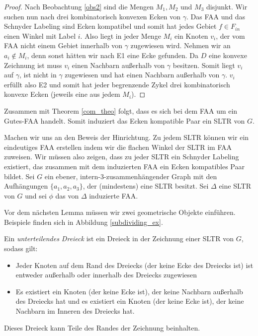 \begin{proof}
Nach Beobachtung \ref{obs2} sind die Mengen $M_1,M_2$ und $M_3$ disjunkt. Wir suchen nun nach drei kombinatorisch konvexen Ecken von $\gamma$. Das FAA und das Schnyder Labeling sind Ecken kompatibel und somit hat jedes Gebiet $f \in F_{in}$ einen Winkel mit Label $i$. Also liegt in jeder Menge $M_i$ ein Knoten $v_i$, der vom FAA nicht einem Gebiet innerhalb von $\gamma$ zugewiesen wird. Nehmen wir an $a_i \notin M_i$, denn sonst hätten wir nach E1 eine Ecke gefunden. Da $D$ eine konvexe Zeichnung ist muss $v_i$ einen Nachbarn außerhalb von $\gamma$ besitzen. Somit liegt $v_i$ auf $\gamma$, ist nicht in $\gamma$ zugewiesen und hat einen Nachbarn außerhalb von $\gamma$. $v_i$ erfüllt also E2 und somit hat jeder begrenzende Zykel drei kombinatorisch konvexe Ecken (jeweils eine aus jedem $M_i$).
\end{proof}

Zusammen mit Theorem \ref{com_theo} folgt, dass es sich bei dem FAA um ein Gutes-FAA handelt. Somit induziert das Ecken kompatible Paar ein SLTR von $G$.

Machen wir uns an den Beweis der Hinrichtung. Zu jedem SLTR können wir ein eindeutiges FAA erstellen indem wir die flachen Winkel der SLTR im FAA zuweisen. Wir müssen also zeigen, dass zu jeder SLTR ein Schnyder Labeling existiert, das zusammen mit dem induzierten FAA ein Ecken kompatibles Paar bildet. Sei $G$ ein ebener, intern-3-zusammenhängender Graph mit den Aufhängungen $\{a_1,a_2,a_3\}$, der (mindestens) eine SLTR besitzt. Sei $\Delta$ eine SLTR von $G$ und sei $\phi$ das von $\Delta$ induzierte FAA.

Vor dem nächsten Lemma müssen wir zwei geometrische Objekte einführen. Beispiele finden sich in Abbildung \ref{subdividing_ex}.

\begin{definition}
Ein \textit{unterteilendes Dreieck} ist ein Dreieck in der Zeichnung einer SLTR von $G$, sodass gilt:
\begin{itemize}
\item Jeder Knoten auf dem Rand des Dreiecks (der keine Ecke des Dreiecks ist) ist entweder außerhalb oder innerhalb des Dreiecks zugewiesen
\item Es existiert ein Knoten (der keine Ecke ist), der keine Nachbarn außerhalb des Dreiecks hat und es existiert ein Knoten (der keine Ecke ist), der keine Nachbarn im Inneren des Dreiecks hat.
\end{itemize}
Dieses Dreieck kann Teile des Randes der Zeichnung beinhalten.
\end{definition}

